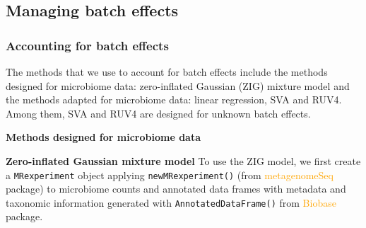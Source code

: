 \documentclass[
]{book}
\newenvironment{Shaded}{\begin{snugshade}}{\end{snugshade}}
\newcommand{\AttributeTok}[1]{\textcolor[rgb]{0.77,0.63,0.00}{#1}}
\newcommand{\CommentTok}[1]{\textcolor[rgb]{0.56,0.35,0.01}{\textit{#1}}}
\newcommand{\FunctionTok}[1]{\textcolor[rgb]{0.00,0.00,0.00}{#1}}
\newcommand{\NormalTok}[1]{#1}
\newcommand{\OtherTok}[1]{\textcolor[rgb]{0.56,0.35,0.01}{#1}}
\newcommand{\SpecialCharTok}[1]{\textcolor[rgb]{0.00,0.00,0.00}{#1}}
\begin{document}
\hypertarget{managing-batch-effects-2}{%
\subsection{Managing batch effects}\label{managing-batch-effects-2}}

\hypertarget{accounting-for-batch-effects-1}{%
\subsubsection{Accounting for batch effects}\label{accounting-for-batch-effects-1}}

The methods that we use to account for batch effects include the methods designed for microbiome data: zero-inflated Gaussian (ZIG) mixture model and the methods adapted for microbiome data: linear regression, SVA and RUV4. Among them, SVA and RUV4 are designed for unknown batch effects.

\textbf{Methods designed for microbiome data}

\textbf{Zero-inflated Gaussian mixture model} To use the ZIG model, we first create a \texttt{MRexperiment} object applying \texttt{newMRexperiment()} (from \textcolor{orange}{metagenomeSeq} package) to microbiome counts and annotated data frames with metadata and taxonomic information generated with \texttt{AnnotatedDataFrame()} from \textcolor{orange}{Biobase} package.

\begin{Shaded}
\end{Shaded}
\end{document}
